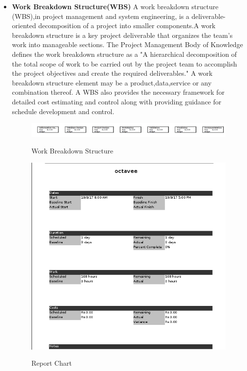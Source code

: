 \begin{itemize}
\item \textbf{Work Breakdown Structure(WBS)}
A work breakdown structure (WBS),in project management and system engineering, is a deliverable-oriented decomposition of a project into smaller components.A work breakdown structure is a key project deliverable that organizes the team's work into manageable sections. The Project Management Body of Knowledge defines the work breakdown structure as a "A hierarchical decomposition of the total scope of work to be carried out by the project team to accomplish the project objectives and create the required deliverables."
A work breakdown structure element may be a product,data,service or any combination thereof. A WBS also provides the necessary framework for detailed cost estimating and control along with providing guidance for schedule development and control.

\begin{figure}[!ht]
\centering
\includegraphics[width=1\linewidth]{input/images/img3.png}
\label{fig:image1}
\caption{Work Breakdown Structure}
\end{figure}

\begin{figure}[!ht]
\centering
\includegraphics[width=0.8\linewidth]{input/images/reportchart.png}
\label{fig:image1}
\caption{Report Chart}
\end{figure}



\end{itemize}
